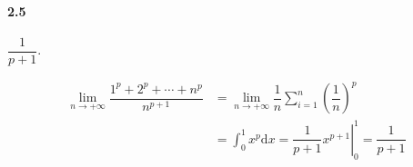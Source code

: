 \paragraph*{2.5}$\dfrac{1}{p+1}$.

\[
	\begin{aligned}
\lim_{n\to+\infty}\dfrac{1^p+2^p+\cdots+n^p}{n^{p+1}}&=\lim_{n\to+\infty}\dfrac{1}{n}\sum_{i=1}^n\left(\dfrac{1}{n}\right)^p\\
&=\int_{0}^{1}x^p\mathrm{d}x=\left.\dfrac{1}{p+1}x^{p+1}\right|_{0}^{1}=\dfrac{1}{p+1}
	\end{aligned}
\]